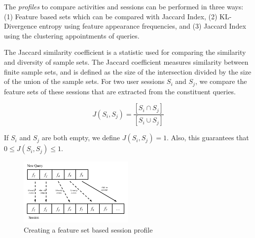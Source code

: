 

The \emph{profiles} to compare activities and sessions can be performed in three ways: (1) Feature based sets which can be compared with Jaccard Index, (2) KL-Divergence entropy using feature appearance frequencies, and (3) Jaccard Index using the clustering appointments of queries.

 The Jaccard similarity coefficient is a statistic used for comparing the similarity and diversity of sample sets. The Jaccard coefficient measures similarity between finite sample sets, and is defined as the size of the intersection divided by the size of the union of the sample sets. For two user sessions $S_i$ and $S_j$, we compare the feature sets of these sessions that are extracted from the constituent queries.

$$J(S_i,S_j) = \frac{\left[S_i\cap S_j\right]}{\left[S_i\cup S_j\right]}$$

If $S_i$ and $S_j$ are both empty, we define $J(S_i,S_j) = 1$. Also, this guarantees that $0\leq J(S_i,S_j) \leq 1$.


\begin{figure}[h!]
    \centering
    \includegraphics[width=0.5\textwidth]{graphics/featurebased.png}
    \caption{Creating a feature set based session profile}
    \label{fig:featureBasedSessionProfile}
\end{figure}



